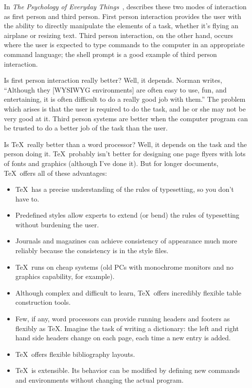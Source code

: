 In {\it The Psychology of Everyday Things}~\cite{dn:psyeveryday},
 describes these 
two modes of interaction as first person
and third person.  First person interaction provides the user with
the ability to directly manipulate the elements of a task, whether it's
flying an airplane or resizing text.  Third person interaction, on the
other hand, occurs where the user is expected to type commands to the
computer in an appropriate command language; the shell prompt is a good
example of third person interaction.

Is first person interaction really better?  Well, it depends.  Norman 
writes, ``Although
they [WYSIWYG environments] are often easy to use, fun, and entertaining, it is often difficult
to do a really good job with them.''  The
problem which arises is that the user is required to do the task, and he
or she may not be very good at it.  Third person systems are better when
the computer program can be trusted to do a better job of the task than
the user.

Is \TeX\ really better than a word processor?  Well, it depends on the
task and the person doing it.  \TeX\ probably isn't better for designing
one page flyers with lots of fonts and graphics (although I've done it).
But for longer documents, \TeX\ offers all of these advantages: 

\begin{itemize}
  \item \TeX\ has a precise understanding of the rules of 
        typesetting, so you don't have to.
  \item Predefined styles allow experts to extend (or bend) the rules
        of typesetting without burdening the user.
  \item Journals and magazines can achieve consistency of appearance
        much more reliably because the consistency is in the style files.
  \item \TeX\ runs on cheap systems (old PCs with monochrome monitors and
        no graphics capability, for example).
  \item Although complex and difficult to learn, \TeX\ offers incredibly flexible table
        construction tools.
  \item Few, if any, word processors can provide running headers and footers
        as flexibly as \TeX.  Imagine the task of writing a dictionary: the
        left and right hand side headers change on each page, each time a 
        new entry is added.
  \item \TeX\ offers flexible bibliography layouts.
  \item \TeX\ is extensible. Its behavior 
        can be modified by defining new commands and environments 
        without changing the actual program.
\end{itemize}


